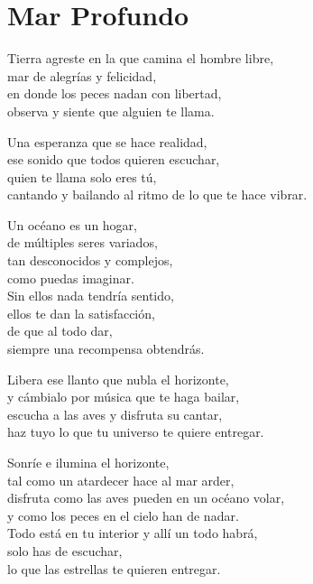 \section*{Mar Profundo}
\label{Mar_Profundo}

\vspace{1em}
\begin{center}
Tierra agreste en la que camina el hombre libre,\\
mar de alegrías y felicidad,\\
en donde los peces nadan con libertad,\\
observa y siente que alguien te llama.

\vspace{1em}
Una esperanza que se hace realidad,\\
ese sonido que todos quieren escuchar,\\
quien te llama solo eres tú,\\
cantando y bailando al ritmo de lo que te hace vibrar.

\vspace{1em}
Un océano es un hogar,\\
de múltiples seres variados,\\
tan desconocidos y complejos,\\
como puedas imaginar.\\
Sin ellos nada tendría sentido,\\
ellos te dan la satisfacción,\\
de que al todo dar,\\
siempre una recompensa obtendrás.

\vspace{1em}
Libera ese llanto que nubla el horizonte,\\
y cámbialo por música que te haga bailar,\\
escucha a las aves y disfruta su cantar,\\
haz tuyo lo que tu universo te quiere entregar.

\vspace{1em}
Sonríe e ilumina el horizonte,\\
tal como un atardecer hace al mar arder,\\
disfruta como las aves pueden en un océano volar,\\
y como los peces en el cielo han de nadar.\\
Todo está en tu interior y allí un todo habrá,\\
solo has de escuchar,\\
lo que las estrellas te quieren entregar.


\end{center}
